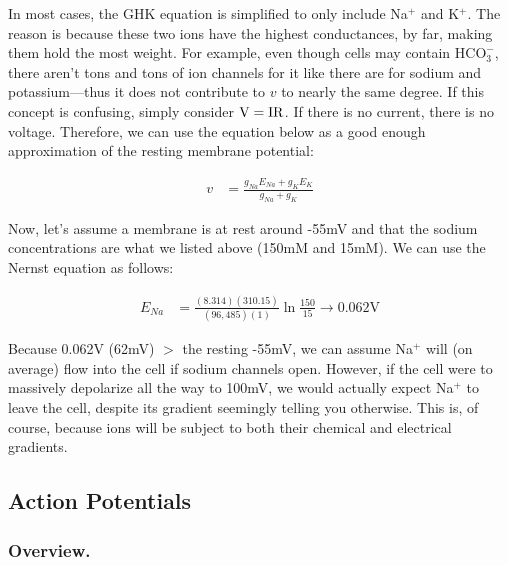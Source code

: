 In most cases, the GHK equation is simplified to only include Na$^+$ and K$^+$. The reason is because these two ions have the highest conductances, by far, making them hold the most weight. For example, even though cells may contain $\mathrm{HCO}_3^-$, there aren't tons and tons of ion channels for it like there are for sodium and potassium---thus it does not contribute to $v$ to nearly the same degree. If this concept is confusing, simply consider ${\rm V} = \mathrm{IR}$. If there is no current, there is no voltage. Therefore, we can use the equation below as a good enough approximation of the resting membrane potential:

\begin{equation} \label{GHK2}
\begin{split}
v &= \frac{g_{Na}E_{Na} + g_{K}E_{K}}{g_{Na} + g_{K}}
\end{split}
\end{equation}

Now, let's assume a membrane is at rest around -55mV and that the sodium concentrations are what we listed above (150mM and 15mM). We can use the Nernst equation as follows: 

\begin{equation} \label{Nernst1}
\begin{split}
E_{Na} &= \frac{(8.314)(310.15)}{(96,485)(1)}\ln\frac{150}{15} \rightarrow 0.062\mathrm{V}
\end{split}
\end{equation}

Because 0.062V (62mV) $>$ the resting -55mV, we can assume Na$^+$ will (on average) flow into the cell if sodium channels open. However, if the cell were to massively depolarize all the way to 100mV, we would actually expect Na$^+$ to leave the cell, despite its gradient seemingly telling you otherwise. This is, of course, because ions will be subject to both their chemical and electrical gradients. 

\subsection{Action Potentials}

\subsubsection{Overview.}

